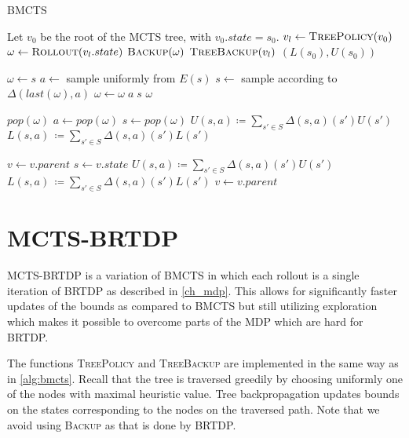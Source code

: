 \begin{algorithm}[H]
\caption{BMCTS}
\label{alg:bmcts}
\begin{algorithmic}[1]
    \State Let $v_0$ be the root of the MCTS tree, with $v_0.state = s_0$.
        \State $v_l \gets \Call{TreePolicy}{v_0}$
        \State $\omega \gets \Call{Rollout}{v_l.state}$
        \State $\Call{Backup}{\omega}$
        \State $\Call{TreeBackup}{v_l}$
    \EndWhile
    \State \Return $(L(s_0), U(s_0))$
\EndFunction

    \State $\omega \gets s$
        \State $a \gets$ sample uniformly from $E(s)$
        \State $s \gets$ sample according to $\Delta(last(\omega),a)$
        \State $\omega \gets \omega \; a \; s$
    \EndWhile
    \State \Return $\omega$
\EndFunction

    \State $pop(\omega)$
    \State $a \gets pop(\omega)$
    \State $s \gets pop(\omega)$
    \State $U(s,a) \coloneqq \sum_{s' \in S} \Delta(s,a)(s')U(s')$
    \State $L(s,a)\, \coloneqq \sum_{s' \in S} \Delta(s,a)(s')L(s')$
\EndWhile
\EndFunction

\State $v \gets v.parent$ 
    \State $s \gets v.state$
        \State $U(s,a) \coloneqq \sum_{s' \in S} \Delta(s,a)(s')U(s')$
        \State $L(s,a)\, \coloneqq \sum_{s' \in S} \Delta(s,a)(s')L(s')$
    \EndFor
    \State $v \gets v.parent$
\EndWhile
\EndFunction
\end{algorithmic}
\end{algorithm}


\section{MCTS-BRTDP}

MCTS-BRTDP is a variation of BMCTS in which each rollout is a
single iteration of BRTDP as described in \autoref{ch_mdp}. This allows
for significantly faster updates of the bounds as compared to BMCTS but
still utilizing exploration which makes it possible to overcome parts of
the MDP which are hard for BRTDP.

The functions \textsc{TreePolicy} and \textsc{TreeBackup} are
implemented in the same way as in \autoref{alg:bmcts}. Recall that the
tree is traversed greedily by choosing uniformly one of the nodes with
maximal heuristic value. Tree backpropagation updates bounds on the
states corresponding to the nodes on the traversed path. Note that we
avoid using \textsc{Backup} as that is done by BRTDP.

